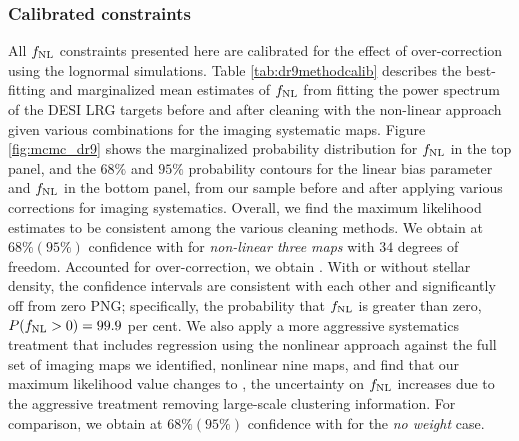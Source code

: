 \subsubsection{Calibrated constraints}
All $f_{\rm NL}$ constraints presented here are calibrated for the effect of over-correction using the lognormal simulations. Table \ref{tab:dr9methodcalib} describes the best-fitting and marginalized mean estimates of $f_{\rm NL}$ from fitting the power spectrum of the DESI LRG targets before and after cleaning with the non-linear approach given various combinations for the imaging systematic maps. Figure \ref{fig:mcmc_dr9} shows the marginalized probability distribution for $f_{\rm NL}$ in the top panel, and the $68\%$ and $95\%$ probability contours for the linear bias parameter and $f_{\rm NL}$ in the bottom panel, from our sample before and after applying various corrections for imaging systematics. Overall, we find the maximum likelihood estimates to be consistent among the various cleaning methods. We obtain  at $68\%(95\%)$ confidence with  for \textit{non-linear three maps} with $34$ degrees of freedom. Accounted for over-correction, we obtain . With or without stellar density, the confidence intervals are consistent with each other and significantly off from zero PNG; specifically, the probability that $f_{\rm NL}$ is greater than zero, $P(f_{\rm NL} >0)=99.9$ per cent. We also apply a more aggressive systematics treatment that includes regression using the nonlinear approach against the full set of imaging maps we identified, nonlinear nine maps, and find that our maximum
likelihood value changes  to ,   the uncertainty on $f_{\rm NL}$ increases  due
to the aggressive treatment removing large-scale clustering information. For comparison, we obtain  at $68\% (95\%)$ confidence with  for the \textit{no weight} case.


